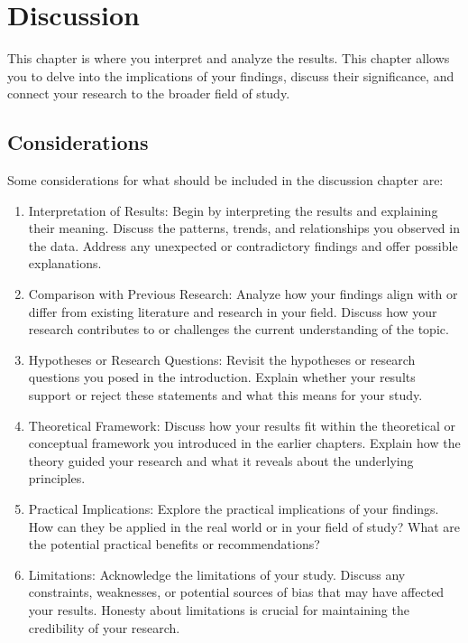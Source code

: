 \chapter{Discussion} 
\label{chapter:Discussion}
 
This chapter is where you interpret and analyze the results. This chapter allows you to delve into the implications of your findings, discuss their significance, and connect your research to the broader field of study. 

\section{Considerations}

Some considerations for what should be included in the discussion chapter are:

\begin{enumerate}

\item Interpretation of Results: Begin by interpreting the results and explaining their meaning. Discuss the patterns, trends, and relationships you observed in the data. Address any unexpected or contradictory findings and offer possible explanations.

\item Comparison with Previous Research: Analyze how your findings align with or differ from existing literature and research in your field. Discuss how your research contributes to or challenges the current understanding of the topic.

\item Hypotheses or Research Questions: Revisit the hypotheses or research questions you posed in the introduction. Explain whether your results support or reject these statements and what this means for your study.

\item Theoretical Framework: Discuss how your results fit within the theoretical or conceptual framework you introduced in the earlier chapters. Explain how the theory guided your research and what it reveals about the underlying principles.

\item Practical Implications: Explore the practical implications of your findings. How can they be applied in the real world or in your field of study? What are the potential practical benefits or recommendations?

\item Limitations: Acknowledge the limitations of your study. Discuss any constraints, weaknesses, or potential sources of bias that may have affected your results. Honesty about limitations is crucial for maintaining the credibility of your research.


\end{enumerate}
